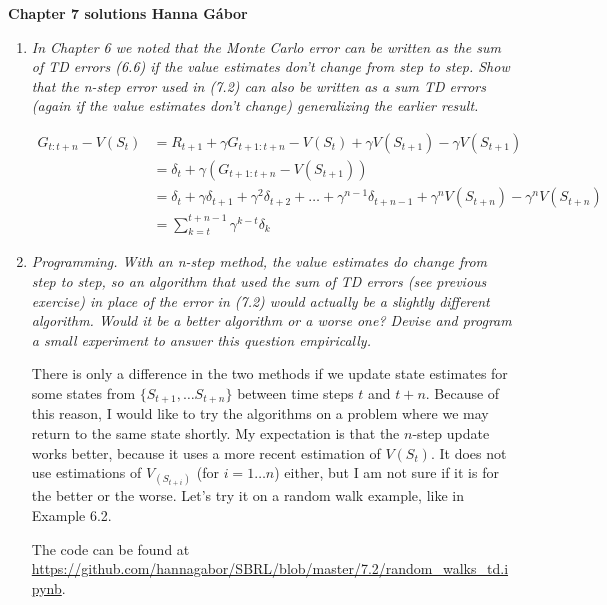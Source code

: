\documentclass[12pt,a4paper]{article}
\begin{document}
\textbf{Chapter 7 solutions  \hfill Hanna Gábor}

\begin{enumerate}
  \item
    \textit{In Chapter 6 we noted that the Monte Carlo error can be written as the
    sum of TD errors (6.6) if the value estimates don’t change from step to step. Show that
    the n-step error used in (7.2) can also be written as a sum TD errors (again if the value
    estimates don’t change) generalizing the earlier result.}

    \begin{align*}
      G_{t: t + n} - V(S_t) & = R_{t + 1} + \gamma G_{t + 1: t + n} - V(S_t) + \gamma V(S_{t + 1}) - \gamma V(S_{t + 1})\\
      & = \delta_t + \gamma(G_{t + 1: t + n} - V(S_{t + 1})) \\
      & = \delta_t + \gamma \delta_{t + 1} + \gamma^2 \delta_{t + 2} + \dots + \gamma^{n - 1} \delta_{t + n - 1} + \gamma^{n}V(S_{t + n}) - \gamma^n V(S_{t + n}) \\
      & = \sum\limits_{k = t}^{t + n - 1} \gamma^{k - t} \delta_k
    \end{align*}

  \item
    \textit{Programming. With an n-step method, the value estimates do change from
    step to step, so an algorithm that used the sum of TD errors (see previous exercise) in
    place of the error in (7.2) would actually be a slightly different algorithm. Would it be a
    better algorithm or a worse one? Devise and program a small experiment to answer this
    question empirically.}

    There is only a difference in the two methods if we update state estimates for some states from
    $\{S_{t + 1}, \dots S_{t + n}\}$ between time steps $t$ and $t + n$. Because of this reason,
    I would like to try the algorithms on a problem where we may return to the same
    state shortly. My expectation is that the $n$-step update works better, because it uses
    a more recent estimation of $V(S_t)$. It does not use estimations of $V_(S_{t + i})$
    (for $i = 1 \dots n$) either, but I am not sure if it is for the better or the worse. Let's try it on a random walk example, like in Example 6.2.

    The code can be found at \url{https://github.com/hannagabor/SBRL/blob/master/7.2/random_walks_td.ipynb}.


\end{enumerate}
\end{document}
